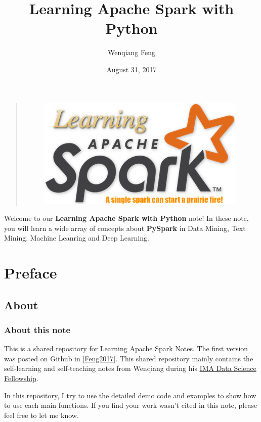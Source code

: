 \documentclass[letterpaper,11pt,english]{sphinxmanual}
\title{Learning Apache Spark with Python}
\date{August 31, 2017}
\author{Wenqiang Feng}
\begin{document}
\maketitle
\tableofcontents
{}\label{index::doc}\label{index:index}\begin{quote}
\begin{figure}[htbp]
\centering

\includegraphics{logo.jpg}
\label{index:fig-logo}\end{figure}
\end{quote}

Welcome to our \textbf{Learning Apache Spark with Python} note!
In these note, you will learn a wide array of concepts about
\textbf{PySpark} in Data Mining, Text Mining, Machine Leanring
and Deep Learning.




\chapter{Preface}
\label{preface:id1}\label{preface::doc}\label{preface:contents}\label{preface:preface}

\section{About}
\label{preface:about}

\subsection{About this note}
\label{preface:about-this-note}
This is a shared repository for Learning Apache Spark Notes.
The first version was posted on Github in {\hyperref[reference:feng2017]{{[}Feng2017{]}}}.
This shared repository mainly contains the self-learning and
self-teaching notes from Wenqiang during his \href{https://www.ima.umn.edu/2016-2017/SW1.23-3.10.17\#}{IMA Data Science
Fellowship}.

In this repository, I try to use the detailed demo code and
examples to show how to use each main functions. If you find
your work wasn’t cited in this note, please feel free to let
me know.
\end{document}
